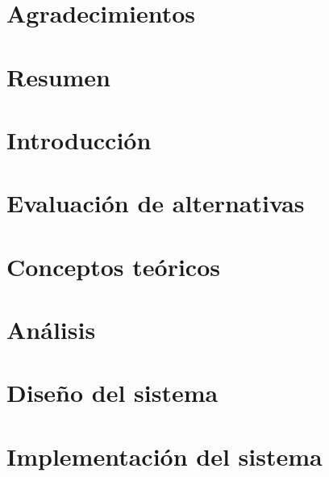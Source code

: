 \documentclass{report}
\begin{document}


\newpage
\thispagestyle{plain}
\mbox{}

\chapter*{Agradecimientos}
\label{agradecimientos}


\newpage
\thispagestyle{plain}
\mbox{}

\chapter*{Resumen}
\label{resumen}


\newpage
\thispagestyle{plain}
\mbox{}

\tableofcontents
{}

\listoffigures

\listoftables

\chapter{Introducción}
\label{chapter01}


\chapter{Evaluación de alternativas}
\label{chapter02}


\chapter{Conceptos teóricos}
\label{chapter03}


\chapter{Análisis}
\label{chapter04}


\chapter{Diseño del sistema}
\label{chapter05}


\chapter{Implementación del sistema}
\label{chapter:implementacion}

\end{document}
